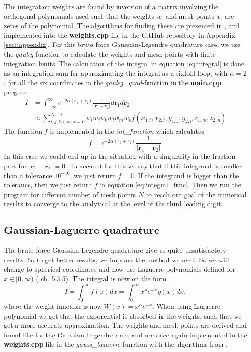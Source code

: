\documentclass[12pt,a4paper,english]{article}
\begin{document}
The integration weights are found by inversion of a matrix involving the orthogonal polynomials used such that the weights $w_i$ and mesh points $x_i$ are zeros of the polynomial. The algorithms for finding these are presented in \citet{press2007numerical}, and implemented into the \textbf{weights.cpp} file in the GitHub repository in Appendix \ref{sect:appendix}. For this brute force Gaussian-Legendre quadrature case, we use the \textit{gauleg}-function to calculate the weights and mesh points with finite integration limits. The calculation of the integral in equation \ref{eq:integral} is done as an integration sum for approximating the integral as a sixfold loop, with $\alpha=2$, for all the six coordinates in the \textit{gauleg\_quad}-function in the \textbf{main.cpp} program:
\begin{align}
I&=\int_{-\infty}^{\infty}e^{-2\alpha(r_1+r_2)}\frac{1}{|\textbf{r}_1-\textbf{r}_2|}d\textbf{r}_1d\textbf{r}_2\nonumber\\
\label{eq:gauleg_quad}
&\approx \sum_{i,j,k,l,m,n=0}^{N-1}w_iw_jw_kw_lw_mw_nf(x_{1,i},x_{2,j},y_{1,k},y_{2,l},z_{1,m},z_{2,n})
\end{align}
The function $f$ is implemented in the \textit{int\_function} which calculates 
\begin{equation}
\label{eq:integral_func}
f=e^{-2\alpha(r_1+r_2)}\frac{1}{|\textbf{r}_1-\textbf{r}_2|}.
\end{equation} In this case we could end up in the situation with a singularity in the fraction part for $|\textbf{r}_1-\textbf{r}_2|=0$. To account for this we say that if this integrand is smaller than a tolerance $10^{-10}$, we just return $f=0$. If the integrand is bigger than the tolerance, then we just return $f$ in equation \ref{eq:integral_func}. Then we run the program for different number of mesh points $N$ to reach our goal of the numerical results to converge to the analytical at the level of the third leading digit.

\subsection{Gaussian-Laguerre quadrature}
The brute force Gaussian-Legendre quadrature give us quite unsatisfactory results. So to get better results, we improve the method we used. So we will change to spherical coordinates and now use Laguerre polynomials defined for $x\in[0,\infty)$ (\citet{lectures} ch. 5.3.5). The integral is now on the form
\begin{equation}
\label{eq:gaulag_quad}
I=\int_{0}^{\infty}f(x)dx=\int_{0}^{\infty}x^{\alpha}e^{-x}g(x)dx,
\end{equation}
where the weight function is now $W(x)=x^{\alpha}e^{-x}$. When using Laguerre polynomial we get that the exponential is absorbed in the weights, such that we get a more accurate approximation. The weights and mesh points are derived and found like for the Gaussian-Legendre case, and are once again implemented in the \textbf{weights.cpp} file in the \textit{gauss\_laguerre} function with the algorithms from \citet{press2007numerical}.
\end{document}
